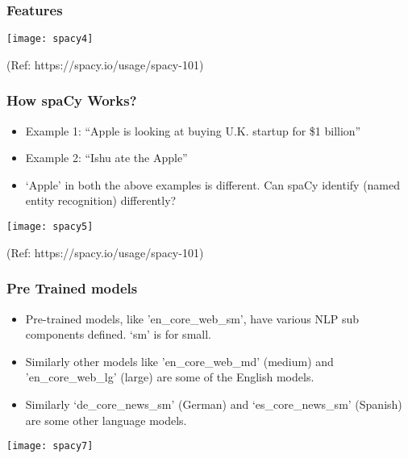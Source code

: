 \begin{frame}[fragile]\frametitle{Features}
\begin{center}
\texttt{[image: spacy4]}
\end{center}

{\tiny (Ref: https://spacy.io/usage/spacy-101)}
\end{frame}



\begin{frame}[fragile]\frametitle{How spaCy Works?}
  \begin{itemize}
    \item Example 1: ``Apple is looking at buying U.K. startup for \$1 billion''
		\item Example 2: ``Ishu ate the Apple''
		\item `Apple' in both the above examples is different. Can spaCy identify (named entity recognition) differently?
  \end{itemize}
	
\begin{center}
\texttt{[image: spacy5]}
\end{center}
	
{\tiny (Ref: https://spacy.io/usage/spacy-101)}
\end{frame}

\begin{frame}[fragile]\frametitle{Pre Trained models}
\begin{itemize}
\item Pre-trained models, like 'en\_core\_web\_sm', have various NLP sub components defined. `sm' is for small.
\item Similarly other models like  'en\_core\_web\_md' (medium) and 'en\_core\_web\_lg' (large) are some of the English models.
\item Similarly `de\_core\_news\_sm' (German) and  `es\_core\_news\_sm' (Spanish) are some other language models.
\end{itemize}

\begin{center}
\texttt{[image: spacy7]}
\end{center}

\end{frame}


